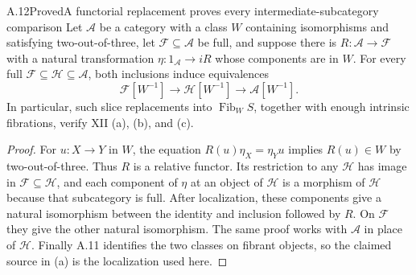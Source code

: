 \begin{claim}{A.12}{Proved}{A functorial replacement proves every intermediate-subcategory comparison}
Let $\mathcal A$ be a category with a class $W$ containing isomorphisms and satisfying two-out-of-three, let $\mathcal F\subseteq\mathcal A$ be full, and suppose there is $R:\mathcal A\to\mathcal F$ with a natural transformation $\eta:1_{\mathcal A}\to iR$ whose components are in $W$. For every full $\mathcal F\subseteq\mathcal H\subseteq\mathcal A$, both inclusions induce equivalences
\[
\mathcal F[W^{-1}]\longrightarrow\mathcal H[W^{-1}]
\longrightarrow\mathcal A[W^{-1}].
\]
In particular, such slice replacements into $\operatorname{Fib}_W S$, together with enough intrinsic fibrations, verify XII (a), (b), and (c).
\end{claim}
\begin{proof}
For $u:X\to Y$ in $W$, the equation $R(u)\eta_X=\eta_Yu$ implies $R(u)\in W$ by two-out-of-three. Thus $R$ is a relative functor. Its restriction to any $\mathcal H$ has image in $\mathcal F\subseteq\mathcal H$, and each component of $\eta$ at an object of $\mathcal H$ is a morphism of $\mathcal H$ because that subcategory is full. After localization, these components give a natural isomorphism between the identity and inclusion followed by $R$. On $\mathcal F$ they give the other natural isomorphism. The same proof works with $\mathcal A$ in place of $\mathcal H$. Finally A.11 identifies the two classes on fibrant objects, so the claimed source in (a) is the localization used here.
\end{proof}


